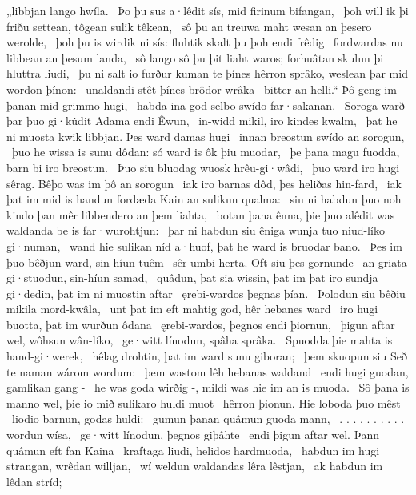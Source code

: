 „libbjan lango hwíla. \hld\ Þo þu sus a·lêdit sís,
mid firinum bifangan, \hld\ þoh will ik þi friðu settean,
tôgean sulik têkean, \hld\ sô þu an treuwa maht
wesan an þesero werolde, \hld\ þoh þu is wirdik ni sís:
fluhtik skalt þu þoh endi frêdig \hld\ fordwardas nu
libbean an þesum landa, \hld\ sô lango sô þu þit liaht waros;
forhuâtan skulun þi hluttra liudi, \hld\ þu ni salt io furður kuman te þínes hêrron sprâko,
weslean þar mid wordon þínon: \hld\ unaldandi stêt
þínes brôdor wrâka \hld\ bitter an helli.“
Þô geng im þanan mid grimmo hugi, \hld\ habda ina god selbo
swído far·sakanan. \hld\ Soroga warð þar þuo gi·ku̇dit
Adama endi Êwun, \hld\ in-widd mikil,
iro kindes kwalm, \hld\ þat he ni muosta kwik libbjan.
Þes ward damas hugi \hld\ innan breostun
swído an sorogun, \hld\ þuo he wissa is sunu dôdan:
só ward is ôk þiu muodar, \hld\ þe þana magu fuodda,
barn bi iro breostun. \hld\ Þuo siu bluodag wuosk
hrêu-gi·wâdi, \hld\ þuo ward iro hugi sêrag.
Bêþo was im þô an sorogun \hld\ iak iro barnas dôd,
þes heliðas hin-fard, \hld\ iak þat im mid is handun fordæda
Kain an sulikun qualma: \hld\ siu ni habdun þuo noh kindo þan mêr
libbendero an þem liahta, \hld\ botan þana ênna, þie þuo alêdit was
waldanda be is far·wurohtjun: \hld\ þar ni habdun siu êniga wunja tuo
niud-líko gi·numan, \hld\ wand hie sulikan níd a·huof,
þat he ward is bruodar bano. \hld\ Þes im þuo bêðjun ward,
sin-híun tuêm \hld\ sêr umbi herta.
Oft siu þes gornunde \hld\ an griata gi·stuodun,
sin-híun samad, \hld\ quâdun, þat sia wissin, þat im þat iro sundja gi·dedin,
þat im ni muostin aftar \hld\ ęrebi-wardos
þegnas þían. \hld\ Þolodun siu bêðiu
mikila mord-kwâla, \hld\ unt þat im eft mahtig god,
hêr hebanes ward \hld\ iro hugi buotta,
þat im wurðun ôdana \hld\ ęrebi-wardos,
þegnos endi þiornun, \hld\ þigun aftar wel,
wôhsun wân-líko, \hld\ ge·witt línodun,
spâha sprâka. \hld\ Spuodda þie mahta
is hand-gi·werek, \hld\ hêlag drohtin,
þat im ward sunu giboran; \hld\ þem skuopun siu Seð te naman
wárom wordum: \hld\ þem wastom lêh
hebanas waldand \hld\ endi hugi guodan,
gamlikan gang - \hld\ he was goda wirðig -,
mildi was hie im an is muoda. \hld\ Sô þana is manno wel,
þie io mið sulikaro huldi muot \hld\ hêrron þionun.
Hie loboda þuo mêst \hld\ liodio barnun,
godas huldi: \hld\ gumun þanan quâmun
guoda mann, \hld\ . . . . . . . . . .
wordun wísa, \hld\ ge·witt línodun,
þegnos giþâhte \hld\ endi þigun aftar wel.
Þann quâmun eft fan Kaina \hld\ kraftaga liudi,
helidos hardmuoda, \hld\ habdun im hugi strangan,
wrêdan willjan, \hld\ wí weldun waldandas
lêra lêstjan, \hld\ ak habdun im lêdan stríd;
